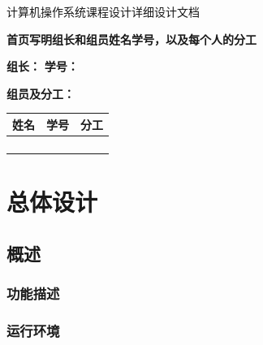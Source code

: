 \documentclass[UTF8,a4paper,12pt]{ctexart}
\newcommand{\blankline}{\par\vspace{1.2em}}
\begin{document}
\begin{center}
    {\heiti 计算机操作系统课程设计详细设计文档}
\end{center}

\vspace{2em}

\noindent\textbf{首页写明组长和组员姓名学号，以及每个人的分工}

\vspace{3em}

\noindent\textbf{组长：} \underline{\hspace{10em}} \quad
\textbf{学号：} \underline{\hspace{10em}}

\vspace{1em}

\noindent\textbf{组员及分工：}

\vspace{0.5em}

\begin{center}
\begin{tabularx}{0.95\textwidth}{|>{\centering\arraybackslash}p{3cm}|>{\centering\arraybackslash}p{4cm}|X|}
\hline
\textbf{姓名} & \textbf{学号} & \multicolumn{1}{c|}{\textbf{分工}} \\
\hline
 & & \\
\hline
 & & \\
\hline
 & & \\
\hline
 & & \\
\hline
\end{tabularx}
\end{center}

\newpage

\section{总体设计}

\subsection{概述}

\subsubsection{功能描述}
\blankline

\subsubsection{运行环境}
\blankline
\end{document}
